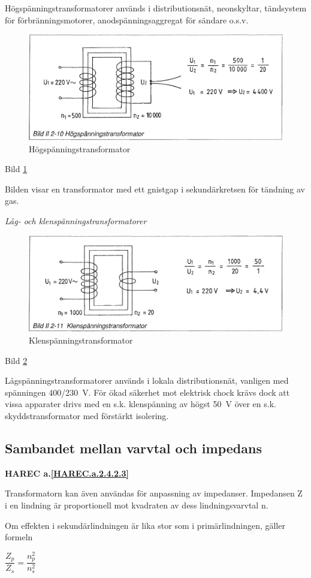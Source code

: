 Högspänningstransformatorer används i distributionsnät, neonskyltar, tändsystem
för förbränningsmotorer, anodspänningsaggregat för sändare o.s.v.

\begin{figure}[h]
\begin{center}
\includegraphics[width=\textwidth]{images/bild_2_2-10}
\caption{Högspänningstransformator}
\label{fig:BildII2-10}
\end{center}
\end{figure}

Bild \ref{fig:BildII2-10}

Bilden visar en transformator med ett gnistgap i sekundärkretsen för tändning av
gas.

\emph{Låg- och klenspänningstransformatorer}

\begin{figure}[h]
\begin{center}
\includegraphics[width=\textwidth]{images/bild_2_2-11}
\caption{Klenspänningstransformator}
\label{fig:BildII2-11}
\end{center}
\end{figure}

Bild \ref{fig:BildII2-11}

Lågspänningstransformatorer används i lokala distributionsnät, vanligen med
spänningen 400/230~V. För ökad säkerhet mot elektrisk chock krävs dock att vissa
apparater drivs med en s.k. klenspänning av högst 50~V över en s.k.
skyddstransformator med förstärkt isolering.

\subsection{Sambandet mellan varvtal och impedans}
\textbf{HAREC a.\ref{HAREC.a.2.4.2.3}\label{myHAREC.a.2.4.2.3}}

Transformatorn kan även användas för anpassning av impedanser. Impedansen Z i en
lindning är proportionell mot kvadraten av dess lindningsvarvtal n.

Om effekten i sekundärlindningen är lika stor som i primärlindningen, gäller
formeln

\(\dfrac{Z_p}{Z_s} = \dfrac{n_p^2}{n_s^2}\)
